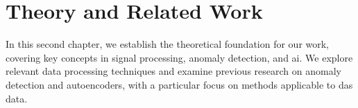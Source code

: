 \chapter{Theory and Related Work}
\label{chap:back}

In this second chapter, we establish the theoretical foundation for our work, covering key concepts in signal processing, anomaly detection, and \acrshort{ai}. We explore relevant data processing techniques and examine previous research on anomaly detection and autoencoders, with a particular focus on methods applicable to \acrshort{das} data.





